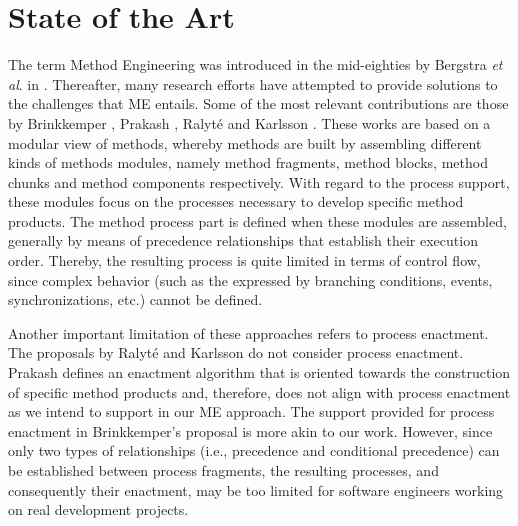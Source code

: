 \documentclass[runningheads,a4paper]{llncs}
\begin{document}
\section{State of the Art}
\label{SectionStateOfTheArt}

The term Method Engineering was introduced in the mid-eighties by Bergstra
\textit{et al}. in \cite{Bergstra85}. Thereafter, many research efforts have
attempted to provide solutions to the challenges that ME entails. Some of the
most relevant contributions are those by Brinkkemper
\cite{Brinkkemper96,Brinkkemper99}, Prakash
\cite{Prakash97,Prakash99}, Ralyt\'e \cite{Ralyte01a,Ralyte01b} and Karlsson
\cite{Karlsson04,Karlsson09}. These works are based on a modular view of
methods, whereby methods are built by assembling different kinds of methods
modules, namely method fragments, method blocks, method chunks and method
components respectively. With regard to the process support, these modules focus
on the processes necessary to develop specific method products. The method
process part is defined when these modules are assembled, generally by means of
precedence relationships that establish their execution order. Thereby, the
resulting process is quite limited in terms of control flow, since complex
behavior (such as the expressed by branching conditions, events,
synchronizations, etc.) cannot be defined.

Another important limitation of these approaches refers to process enactment.
The proposals by Ralyt\'e \cite{Ralyte01a,Ralyte01b} and Karlsson
\cite{Karlsson04,Karlsson09} do not consider process enactment. Prakash
\cite{Prakash97,Prakash99} defines an enactment algorithm that is oriented
towards the construction of specific method products and, therefore, does not
align with process enactment as we intend to support in our ME approach. The
support provided for process enactment in Brinkkemper's proposal
\cite{Brinkkemper96,Brinkkemper99} is more akin to our work. However, since only
two types of relationships (i.e., precedence and conditional precedence) can be
established between process fragments, the resulting processes, and
consequently their enactment, may be too limited for software engineers working
on real development projects.
\end{document}
